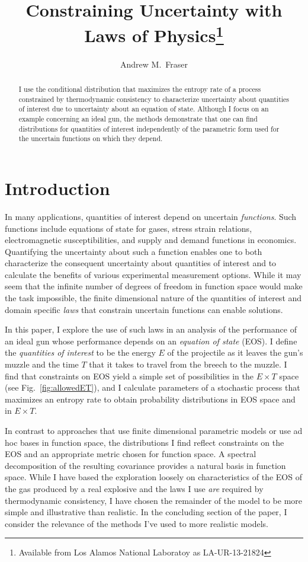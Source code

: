 \documentclass[]{article}
\title{Constraining Uncertainty with Laws of
  Physics\footnote{Available from Los Alamos National Laboratoy as
    LA-UR-13-21824}}
\author{Andrew M.\ Fraser}
\begin{document}
\maketitle
\begin{abstract}
  I use the conditional distribution that maximizes the entropy rate
  of a process constrained by thermodynamic consistency to
  characterize uncertainty about quantities of interest due to
  uncertainty about an equation of state.  Although I focus on an
  example concerning an ideal gun, the methods demonstrate that one
  can find distributions for quantities of interest independently of
  the parametric form used for the uncertain functions on which they
  depend.
\end{abstract}

\section{Introduction}
\label{sec:introduction}

In many applications, quantities of interest depend on uncertain
\emph{functions}.  Such functions include equations of state for
gases, stress strain relations, electromagnetic susceptibilities, and
supply and demand functions in economics.  Quantifying the uncertainty
about such a function enables one to both characterize the consequent
uncertainty about quantities of interest and to calculate the benefits
of various experimental measurement options.  While it may seem that
the infinite number of degrees of freedom in function space would make
the task impossible, the finite dimensional nature of the quantities
of interest and domain specific \emph{laws} that constrain uncertain
functions can enable solutions.

In this paper, I explore the use of such laws in an analysis of the
performance of an ideal gun whose performance depends on an
\emph{equation of state} (EOS).  I define the \emph{quantities of
  interest} to be the energy $E$ of the projectile as it leaves the
gun's muzzle and the time $T$ that it takes to travel from the breech
to the muzzle.  I find that constraints on EOS yield a simple set of
possibilities in the $E\times T$ space (see Fig.~\ref{fig:allowedET}),
and I calculate parameters of a stochastic process that maximizes an
entropy rate to obtain probability distributions in EOS space and in
$E\times T$.

In contrast to approaches that use finite dimensional parametric
models or use ad hoc bases in function space, the distributions I find
reflect constraints on the EOS and an appropriate metric chosen for
function space.  A spectral decomposition of the resulting covariance
provides a natural basis in function space.  While I have based the
exploration loosely on characteristics of the EOS of the gas produced
by a real explosive and the laws I use \emph{are} required by
thermodynamic consistency, I have chosen the remainder of the model to
be more simple and illustrative than realistic.  In the concluding
section of the paper, I consider the relevance of the methods I've
used to more realistic models.
\end{document}
